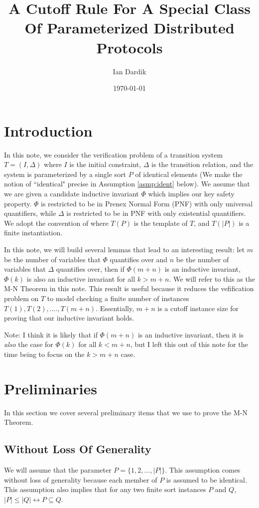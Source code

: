 \documentclass[12pt]{article}
\title{A Cutoff Rule For A Special Class Of Parameterized Distributed Protocols}
\author{Ian Dardik}
\date{\today}
\theoremstyle{definition}
\theoremstyle{remark}
\begin{document}
\maketitle

\section{Introduction}
In this note, we consider the verification problem of a transition system $T=(I,\Delta)$ where $I$ is the initial constraint, $\Delta$ is the transition relation, and the system is parameterized by a single sort $P$ of identical elements (We make the notion of ``identical" precise in Assumption \ref{asmp:ident} below).  We assume that we are given a candidate inductive invariant $\Phi$ which implies our key safety property.  $\Phi$ is restricted to be in Prenex Normal Form (PNF) with only universal quantifiers, while $\Delta$ is restricted to be in PNF with only existential quantifiers.  We adopt the convention of \cite{goel2021symmetry} where $T(P)$ is the template of $T$, and $T(|P|)$ is a finite instantiation.

In this note, we will build several lemmas that lead to an interesting result: let $m$ be the number of variables that $\Phi$ quantifies over and $n$ be the number of variables that $\Delta$ quantifies over, then if $\Phi(m+n)$ is an inductive invariant, $\Phi(k)$ is also an inductive invariant for all $k>m+n$.  We will refer to this as the M-N Theorem in this note.  This result is useful because it reduces the vefification problem on $T$ to model checking a finite number of instances $T(1),T(2),....,T(m+n)$.  Essentially, $m+n$ is a cutoff instance size for proving that our inductive invariant holds.

Note: I think it is likely that if $\Phi(m+n)$ is an inductive invariant, then it is \textit{also} the case for $\Phi(k)$ for all $k<m+n$, but I left this out of this note for the time being to focus on the $k>m+n$ case.



\section{Preliminaries}
In this section we cover several preliminary items that we use to prove the M-N Theorem.

\subsection{Without Loss Of Generality}
We will assume that the parameter $P = \{1,2,...,|P|\}$.  This assumption comes without loss of generality because each member of $P$ is assumed to be identical.  This assumption also implies that for any two finite sort instances $P$ and $Q$, $|P| \leq |Q| \leftrightarrow P \subseteq Q$.
\end{document}
